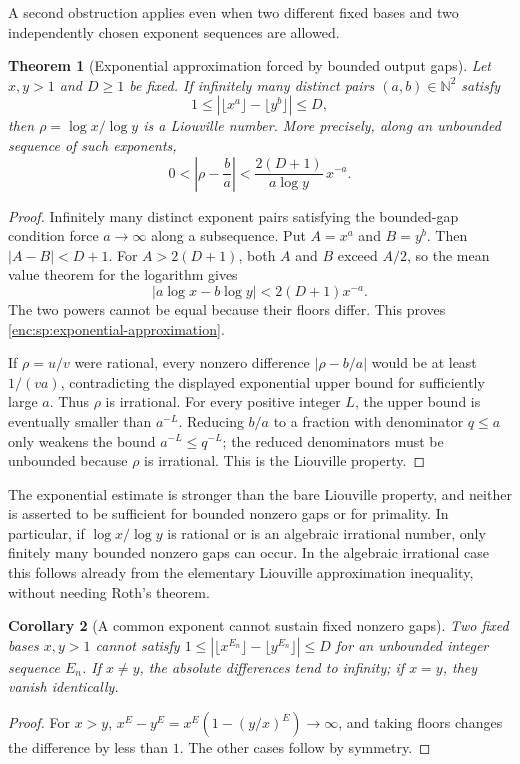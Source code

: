 \documentclass[11pt,a4paper]{article}
\newtheorem{theorem}{Theorem}[section]
\newtheorem{corollary}[theorem]{Corollary}
\theoremstyle{definition}
\theoremstyle{remark}
\numberwithin{equation}{section}
\begin{document}
A second obstruction applies even when two different fixed bases and
two independently chosen exponent sequences are allowed.
\begin{theorem}[Exponential approximation forced by bounded output gaps]
\label{enc:sp:two-base-liouville}
Let $x,y>1$ and $D\ge1$ be fixed. If infinitely many distinct pairs
$(a,b)\in\mathbb N^2$ satisfy
\begin{equation}\label{enc:sp:bounded-nonzero-gap}
 1\le|\lfloor x^a\rfloor-\lfloor y^b\rfloor|\le D,
\end{equation}
then $\rho=\log x/\log y$ is a Liouville number. More precisely, along
an unbounded sequence of such exponents,
\begin{equation}\label{enc:sp:exponential-approximation}
 0<\left|\rho-\frac ba\right|
 <\frac{2(D+1)}{a\log y}\,x^{-a}.
\end{equation}
\end{theorem}
\begin{proof}
Infinitely many distinct exponent pairs satisfying the bounded-gap
condition force $a\to\infty$ along a subsequence. Put $A=x^a$ and
$B=y^b$. Then $|A-B|<D+1$. For $A>2(D+1)$, both $A$ and $B$ exceed
$A/2$, so the mean value theorem for the logarithm gives
\[
 |a\log x-b\log y|<2(D+1)x^{-a}.
\]
The two powers cannot be equal because their floors differ. This proves
\eqref{enc:sp:exponential-approximation}.

If $\rho=u/v$ were rational, every nonzero difference
$|\rho-b/a|$ would be at least $1/(va)$, contradicting the displayed
exponential upper bound for sufficiently large $a$. Thus $\rho$ is
irrational. For every positive integer $L$, the upper bound is eventually
smaller than $a^{-L}$. Reducing $b/a$ to a fraction with denominator
$q\le a$ only weakens the bound $a^{-L}\le q^{-L}$; the reduced
denominators must be unbounded because $\rho$ is irrational. This is
the Liouville property.
\end{proof}

The exponential estimate is stronger than the bare Liouville property,
and neither is asserted to be sufficient for bounded nonzero gaps or
for primality. In particular, if $\log x/\log y$ is rational or is an
algebraic irrational number, only finitely many bounded nonzero gaps
can occur. In the algebraic irrational case this follows already from
the elementary Liouville approximation inequality, without needing
Roth's theorem.

\begin{corollary}[A common exponent cannot sustain fixed nonzero gaps]
\label{enc:sp:common-exponent}
Two fixed bases $x,y>1$ cannot satisfy
$1\le|\lfloor x^{E_n}\rfloor-\lfloor y^{E_n}\rfloor|\le D$ for an
unbounded integer sequence $E_n$. If $x\ne y$, the absolute differences
tend to infinity; if $x=y$, they vanish identically.
\end{corollary}
\begin{proof}
For $x>y$, $x^E-y^E=x^E(1-(y/x)^E)\to\infty$, and taking floors changes
the difference by less than $1$. The other cases follow by symmetry.
\end{proof}
\end{document}
